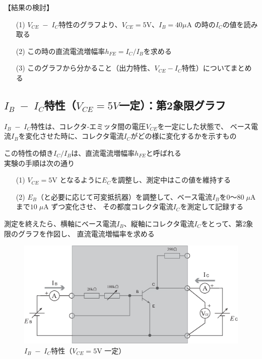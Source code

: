 \documentclass[uplatex,a4paper,11pt,oneside,openany]{jsbook}
\begin{document}
【結果の検討】

\begin{enumerate}
\item[(1)] $V_{CE}\;-\;I_C$特性のグラフより、$V_{CE}=5$V、$I_B=40\mu$A の時の$I_C$の値を読み取る\\
\item[(2)] この時の直流電流増幅率$h_{FE}=I_C/I_B$を求める\\
\item[(3)] このグラフから分かること（出力特性、$V_{CE}-I_C$特性）についてまとめる
\end{enumerate}

\newpage

\subsection{$I_B\;-\;I_C$特性（$V_{CE}=5V$一定）：第2象限グラフ}

$I_B\;-\;I_C$特性は、コレクタ-エミッタ間の電圧$V_{CE}$を一定にした状態で、
ベース電流$I_B$を変化させた時に、コレクタ電流$I_C$がどの様に変化するかを示すもの

この特性の傾き$I_C/I_B$は、直流電流増幅率$h_{FE}$と呼ばれる\\

実験の手順は次の通り

\begin{enumerate}
\item[(1)] $V_{CE}=5$V となるように$E_C$を調整し、測定中はこの値を維持する
\item[(2)] $E_B$（と必要に応じて可変抵抗器）を調整して、ベース電流$I_B$を$0$〜$80\;\mu$A まで$10\;\mu$A ずつ変化させ、
その都度コレクタ電流$I_C$を測定して記録する 
\end{enumerate}

測定を終えたら、横軸にベース電流$I_B$、縦軸にコレクタ電流$I_C$をとって、第2象限のグラフを作図し、
直流電流増幅率を求める

\vfill

\begin{figure}[H]
  \centering
   \includegraphics[keepaspectratio, scale=0.45, angle=0]
               {figs/eps/ex1.eps}
               \caption{$I_B\;-\;I_C$特性（$V_{CE}=5$V 一定）}
               \label{fig:ex2}
\end{figure}
\end{document}
